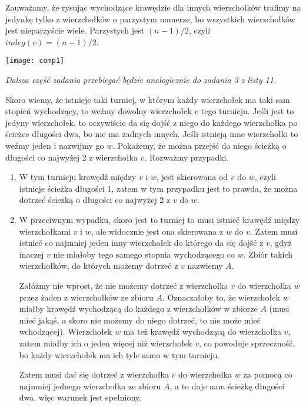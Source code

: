 \documentclass[12pt,a4paper]{article}
\begin{document}
Zauważamy, że rysując wychodzące krawędzie dla innych wierzchołków trafimy na jedynkę tylko z wierzchołków o parzystym numerze, bo wszystkich wierzchołków jest nieparzyście wiele. Parzystych jest \( (n-1)/2 \), czyli \(indeg(v) =  (n-1)/2 \).
\begin{center}
	\texttt{[image: comp1]}
\end{center}
\textit{Dalsza część zadania przebiegać będzie analogicznie do zadania 3 z listy 11.}

Skoro wiemy, że istnieje taki turniej, w którym każdy wierzchołek ma taki sam stopień wychodzący, to weźmy dowolny wierzchołek \(v\) tego turnieju. Jeśli jest to jedyny wierzchołek, to oczywiście da się dojść z niego do każdego wierzchołka po ścieżce długości dwa, bo nie ma żadnych innych. Jeśli istnieją inne wierzchołki to weźmy jeden i nazwijmy go \(w\). Pokażemy, że można przejść do niego ścieżką o długości co najwyżej 2 z wierzchołka \(v\). Rozważmy przypadki.

\begin{enumerate}
	\item W tym turnieju krawędź między \(v\) i \(w\), jest skierowana od \(v\) do \(w\), czyli
	istnieje ścieżka długości 1, zatem w tym przypadku jest to prawda, że można dotrzeć ścieżką o
	długości co najwyżej 2 z \(v\) do \(w\).
	
	\item W przeciwnym wypadku, skoro jest to turniej to musi istnieć krawędź między wierzchołkami
	\(v\) i \(w\), ale widocznie jest ona skierowana z \(w\) do \(v\). Zatem musi istnieć co
	najmniej jeden inny wierzchołek do którego da się dojść z \(v\), gdyż inaczej \(v\) nie 
	miałoby tego samego stopnia wychodzącego co \(w\). Zbiór takich wierzchołków, do których 
	możemy dotrzeć z \(v\) nazwiemy \(A\). 
	
	Załóżmy nie wprost, że nie możemy dotrzeć z wierzchołka \(v\) do wierzchołka \(w\) przez
	żaden z wierzchołków ze zbioru \(A\). Oznaczałoby to, że wierzchołek \(w\) miałby krawędź
	wychodzącą do każdego z wierzchołków w zbiorze \(A\) (musi mieć jakąś, a skoro nie możemy
	do niego dotrzeć, to nie może mieć wchodzącej). Wierzchołek \(w\) ma też krawędź wychodzącą
	do wierzchołka \(v\), zatem miałby ich o jeden więcej niż wierzchołek \(v\), co powoduje
	sprzeczność, bo każdy wierzchołek ma ich tyle samo w tym turnieju. 
	
	Zatem musi dać się dotrzeć 
	z wierzchołka \(v\) do wierzchołka \(w\) za pomocą co najmniej jednego wierzchołka ze zbioru 
	\(A\), a to daje nam ścieżkę długości dwa, więc warunek jest spełniony.
\end{enumerate}
\end{document}

